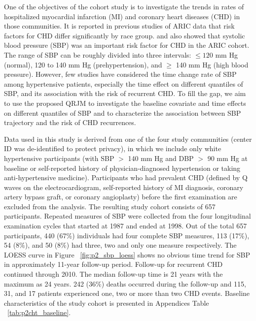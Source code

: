 One of the objectives of the cohort study is to investigate the trends in rates of hospitalized myocardial infarction (MI) and coronary heart diseases (CHD) in those communities. It is reported in previous studies of ARIC data that risk factors for CHD differ significantly by race group. \cite{wattanakit2005risk} and \cite{rodriguez2014systolic} also showed that systolic blood pressure (SBP) was an important risk factor for CHD in the ARIC cohort. The range of SBP can be roughly divided into three intervals: $\le 120$ mm Hg (normal), 120 to 140 mm Hg (prehypertension), and $\ge$ 140 mm Hg (high blood pressure). However, few studies have considered the time change rate of SBP among hypertensive patients, especially the time effect on different quantiles of SBP, and its association with the risk of recurrent CHD. To fill the gap, we aim to use the proposed QRJM to investigate the baseline covariate and time effects on different quantiles of SBP and to characterize the association between SBP trajectory and the risk of CHD recurrences.

Data used in this study is derived from one of the four study communities (center ID was de-identified to protect privacy), in which we include only white hypertensive participants (with SBP $>$ 140 mm Hg and DBP $>$ 90 mm Hg at baseline or self-reported history of physician-diagnosed hypertension or taking anti-hypertensive medicine). Participants who had prevalent CHD (defined by Q waves on the electrocardiogram, self-reported history of MI diagnosis, coronary artery bypass graft, or coronary angioplasty) before the first examination are excluded from the analysis. The resulting study cohort consists of 657 participants. Repeated measures of SBP were collected from the four longitudinal examination cycles that started at 1987 and ended at 1998. Out of the total 657 participants, 440 (67\%) individuals had four complete SBP measures, 113 (17\%), 54 (8\%), and 50 (8\%) had three, two and only one measure respectively. The LOESS curve in Figure ~\ref{fig:p2_sbp_loess} shows no obvious time trend for SBP in approximately 11-year follow-up period. Follow-up for recurrent CHD continued through 2010. The median follow-up time is 21 years with the maximum as 24 years. 242 (36\%) deaths occurred during the follow-up and 115, 31, and 17 patients experienced one, two or more than two CHD events. Baseline characteristics of the study cohort is presented in Appendices Table ~\ref{tab:p2cht_baseline}.

